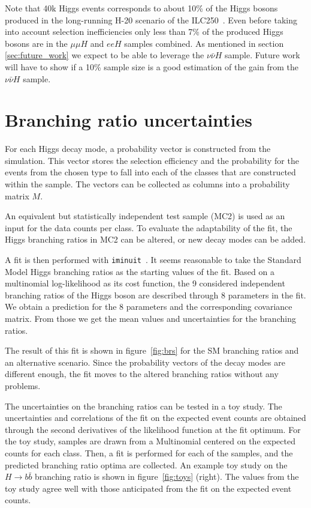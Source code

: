 \documentclass[11pt, hidelinks, a4paper]{scrartcl}
\begin{document}
Note that 40k Higgs events corresponds to about 10\% of the Higgs bosons
produced in the long-running H-20 scenario of the ILC250~\cite{ILC_Scenarios}.
Even before taking into account selection inefficiencies
only less than 7\% of the produced Higgs bosons
are in the $\mu \mu H$ and $e e H$ samples combined.
As mentioned in section \ref{sec:future_work}
we expect to be able to leverage the $\nu \bar{\nu} H$ sample.
Future work will have to show if a 10\% sample size
is a good estimation of the gain from the $\nu \bar{\nu} H$ sample.

\section{Branching ratio uncertainties}\label{sec:fit}
For each Higgs decay mode, a probability vector is
constructed from the simulation.
This vector stores the selection efficiency and the probability
for the events from the chosen type to fall into each of the classes
that are constructed within the sample.
The vectors can be collected as columns into a probability matrix $M$.

An equivalent but statistically independent test sample (MC2) is used as an input for
the data counts per class.
To evaluate the adaptability of the fit, the Higgs branching ratios in MC2
can be altered, or new decay modes can be added.

A fit is then performed with \texttt{iminuit}~\cite{Minuit,iminuit}.
It seems reasonable to take the Standard Model Higgs branching ratios
as the starting values of the fit.
Based on a multinomial log-likelihood as its cost function,
the 9 considered independent branching ratios of the Higgs boson
are described through 8 parameters in the fit.
We obtain a prediction for the 8 parameters
and the corresponding covariance matrix.
From those we get the mean values and uncertainties for the branching ratios.

The result of this fit is shown in figure~\ref{fig:brs} for
the SM branching ratios and an alternative scenario.
Since the probability vectors of the decay modes are different enough,
the fit moves to the altered branching ratios without any problems.

The uncertainties on the branching ratios can be tested in a toy study.
The uncertainties and correlations of the fit on the expected event counts
are obtained through the second derivatives of the likelihood function
at the fit optimum.
For the toy study, samples are drawn from a Multinomial centered on the
expected counts for each class.
Then, a fit is performed for each of the samples, and the predicted
branching ratio optima are collected.
An example toy study on the $H \to b \bar{b}$ branching ratio is shown in
figure~\ref{fig:toys} (right).
The values from the toy study agree well with those anticipated
from the fit on the expected event counts.
\end{document}
